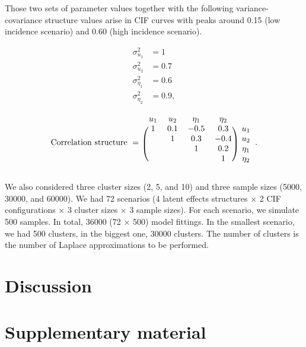 \documentclass[a4paper,12pt]{article}
\begin{document}
Those two sets of parameter values together with the following
variance-covariance structure values arise in CIF curves with peaks
around 0.15 (low incidence scenario) and 0.60 (high incidence scenario).

\begin{minipage}{0.15\textwidth}
 \begin{align*}
  \sigma_{u_{1}}^{2}   &= 1\\
  \sigma_{u_{2}}^{2}   &= 0.7\\
  \sigma_{\eta_{1}}^{2} &= 0.6\\
  \sigma_{\eta_{2}}^{2} &= 0.9,
 \end{align*}
\end{minipage}%
\begin{minipage}{0.85\textwidth}
 \[
  \text{Correlation structure}~=~\begin{blockarray}{ccccc}
                                  u_{1} & u_{2} & \eta_{1} & \eta_{2}\\
                                  \begin{block}{(cccc)c}
                                   1 & 0.1 & -0.5 &  0.3 & u_{1}\\
                                     &   1 &  0.3 & -0.4 & u_{2}\\
                                     &     &    1 &  0.2 & \eta_{1}\\
                                     &     &      &    1 & \eta_{2}\\
                                  \end{block}
                                 \end{blockarray}.
 \]
\end{minipage}

\vspace{0.3cm}
\noindent
We also considered three cluster sizes (2, 5, and 10) and three sample
sizes (5000, 30000, and 60000). We had 72 scenarios (4 latent effects
structures \(\times\) 2 CIF configurations \(\times\) 3 cluster sizes
\(\times\) 3 sample sizes). For each scenario, we simulate 500
samples. In total, 36000 (72 \(\times\) 500) model fittings. In the
smallest scenario, we had 500 clusters, in the biggest one, 30000
clusters. The number of clusters is the number of Laplace approximations
to be performed.

\section{Discussion}
\label{discussion}

\section*{Supplementary material}



\end{document}
